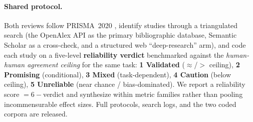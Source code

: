 \paragraph{Shared protocol.} Both reviews follow PRISMA~2020 \citep{page2021prisma}, identify studies through a
triangulated search (the OpenAlex API as the primary bibliographic database, Semantic Scholar as a cross-check, and
a structured web ``deep-research'' arm), and code each study on a five-level \textbf{reliability verdict}
benchmarked against the \emph{human-human agreement ceiling} for the same task: \textbf{1 Validated}
($\approx$/$>$ ceiling), \textbf{2 Promising} (conditional), \textbf{3 Mixed} (task-dependent), \textbf{4 Caution}
(below ceiling), \textbf{5 Unreliable} (near chance / bias-dominated). We report a reliability score $=6-$verdict
and synthesize within metric families rather than pooling incommensurable effect sizes. Full protocols, search
logs, and the two coded corpora are released.

